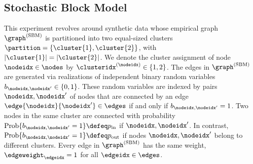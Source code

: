 \documentclass[lettersize,journal]{IEEEtran}
\begin{document}
\subsection{Stochastic Block Model} 
\label{sbm_experiment_section}

This experiment revolves around synthetic data whose empirical graph $\graph^{(\rm SBM)}$ is partitioned 
into two equal-sized clusters $\partition = \{ \cluster{1}, \cluster{2}\}$, with $|\cluster{1}| = |\cluster{2}|$. We denote 
the cluster assignment of node $\nodeidx \in \nodes$ by $\clusteridx^{(\nodeidx)} \in \{1,2\}$. The 
edges in $\graph^{(\rm SBM)}$ are generated via realizations of independent binary 
random variables $b_{\nodeidx,\nodeidx'} \in \{0,1\}$. These random variables are indexed by pairs $\nodeidx,\nodeidx'$ of nodes 
that are connected by an edge $\edge{\nodeidx}{\nodeidx'} \in \edges$ if and only if $b_{\nodeidx,\nodeidx'}=1$. Two nodes 
in the same cluster are connected with probability ${\rm Prob}\{ b_{\nodeidx,\nodeidx'}=1 \} \defeq p_{\rm in}$ if $\nodeidx,\nodeidx'$. 
In contrast, ${\rm Prob}\{ b_{\nodeidx,\nodeidx'}=1 \} \defeq p_{\rm out}$ if nodes $\nodeidx,\nodeidx'$ belong to different clusters. 
Every edge in $\graph^{(\rm SBM)}$ has the same weight, $\edgeweight_{\edgeidx} = 1$ for all $\edgeidx \in \edges$.  
\end{document}
